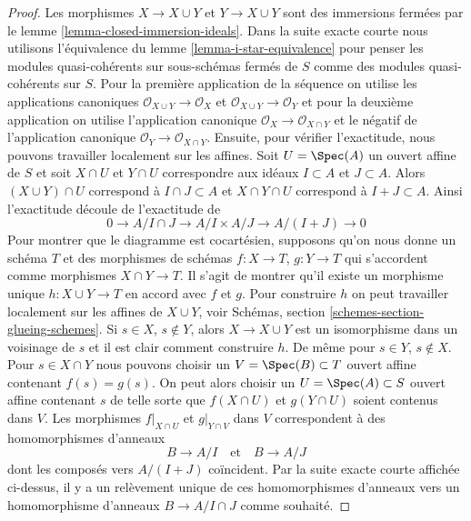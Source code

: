 \begin{proof}
Les morphismes $X \to X \cup Y$ et $Y \to X \cup Y$ sont des immersions fermées par
le lemme \ref{lemma-closed-immersion-ideals}. Dans la suite exacte courte nous utilisons l'équivalence
du lemme \ref{lemma-i-star-equivalence} pour penser les modules quasi-cohérents
sur sous-schémas fermés de $S$ comme des modules quasi-cohérents
sur $S$. Pour la première application de la séquence
on utilise les applications canoniques $\mathcal{O}_{X \cup Y} \to \mathcal{O}_X$
et $\mathcal{O}_{X \cup Y} \to \mathcal{O}_Y$ et pour la deuxième
application on utilise l'application canonique
$\mathcal{O}_X \to \mathcal{O}_{X \cap Y}$ et le négatif de l'application
canonique $\mathcal{O}_Y \to \mathcal{O}_{X \cap Y}$. Ensuite,
pour vérifier l'exactitude, nous pouvons travailler
localement sur les affines.
Soit $U = \Spec(A)$ un ouvert affine de $S$ et soit $X \cap U$ et
$Y \cap U$ correspondre aux idéaux $I \subset A$ et $J \subset A$.
Alors $(X \cup Y) \cap U$ correspond à $I \cap J \subset A$
et $X \cap Y \cap U$ correspond à $I + J \subset A$. Ainsi l'exactitude
découle de l'exactitude de
$$
0 \to A/I \cap J \to A/I \times A/J \to A/(I + J) \to 0
$$
Pour montrer que le diagramme est cocartésien, supposons qu'on nous donne
un schéma $T$ et des morphismes de schémas $f : X \to T$, $g : Y \to T$
qui s'accordent comme morphismes $X \cap Y \to T$. Il s'agit de montrer
qu'il existe un morphisme unique $h : X \cup Y \to T$ en accord
avec $f$ et $g$. Pour construire $h$ on peut
travailler localement sur les affines de $X \cup Y$, voir
Schémas, section \ref{schemes-section-glueing-schemes}. Si $s \in X$, $s \not \in Y$, alors
$X \to X \cup Y$ est un isomorphisme dans un voisinage de $s$
et il est clair comment construire $h$. De même pour
$s \in Y$, $s \not \in X$. Pour $s \in X \cap Y$ nous pouvons
choisir un $V = \Spec(B) \subset T$ ouvert affine contenant $f(s) = g(s)$.
On peut alors choisir un $U = \Spec(A) \subset S$ ouvert affine
contenant $s$ de telle sorte que $f(X \cap U)$ et $g(Y \cap U)$ soient
contenus dans $V$. Les morphismes $f|_{X \cap U}$ et $g|_{Y \cap V}$
dans $V$ correspondent à des homomorphismes d'anneaux
$$
B \to A/I
\quad\text{et}\quad
B \to A/J
$$
dont les composés vers $A/(I + J)$ coïncident. Par la suite exacte courte affichée
ci-dessus, il y a un relèvement unique de ces homomorphismes d'anneaux vers
un homomorphisme d'anneaux $B \to A/I \cap J$ comme souhaité.
\end{proof}










